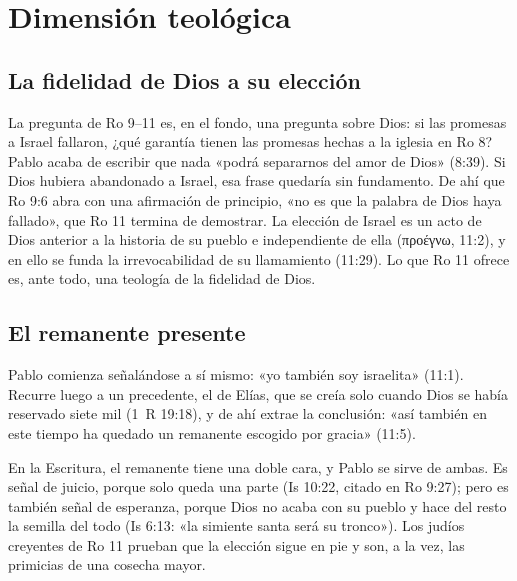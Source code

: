 \documentclass[11pt,letterpaper]{article}
\newcommand{\grc}[1]{\foreignlanguage{ancientgreek}{#1}}
\begin{document}
\section{Dimensión teológica}

\subsection{La fidelidad de Dios a su elección}
La pregunta de Ro 9--11 es, en el fondo, una pregunta sobre Dios: si las promesas a Israel fallaron, ¿qué garantía tienen las promesas hechas a la iglesia en Ro 8? Pablo acaba de escribir que nada «podrá separarnos del amor de Dios» (8:39). Si Dios hubiera abandonado a Israel, esa frase quedaría sin fundamento. De ahí que Ro 9:6 abra con una afirmación de principio, «no es que la palabra de Dios haya fallado», que Ro 11 termina de demostrar. La elección de Israel es un acto de Dios anterior a la historia de su pueblo e independiente de ella (\grc{προέγνω}, 11:2), y en ello se funda la irrevocabilidad de su llamamiento (11:29). Lo que Ro 11 ofrece es, ante todo, una teología de la fidelidad de Dios.

\subsection{El remanente presente}
Pablo comienza señalándose a sí mismo: «yo también soy israelita» (11:1). Recurre luego a un precedente, el de Elías, que se creía solo cuando Dios se había reservado siete mil (1~R 19:18), y de ahí extrae la conclusión: «así también en este tiempo ha quedado un remanente escogido por gracia» (11:5).

En la Escritura, el remanente tiene una doble cara, y Pablo se sirve de ambas. Es señal de juicio, porque solo queda una parte (Is 10:22, citado en Ro 9:27); pero es también señal de esperanza, porque Dios no acaba con su pueblo y hace del resto la semilla del todo (Is 6:13: «la simiente santa será su tronco»). Los judíos creyentes de Ro 11 prueban que la elección sigue en pie y son, a la vez, las primicias de una cosecha mayor.
\end{document}
